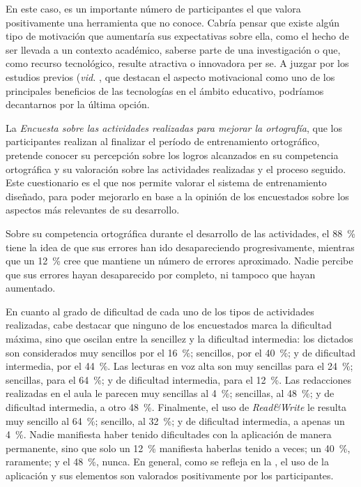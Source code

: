 \documentclass[spanish]{textolivre}
\begin{document}
En este caso, es un importante número de participantes el que valora positivamente una herramienta que no conoce. Cabría pensar que existe algún tipo de motivación que aumentaría sus expectativas sobre ella, como el hecho de ser llevada a un contexto académico, saberse parte de una investigación o que, como recurso tecnológico, resulte atractiva o innovadora per se. A juzgar por los estudios previos (\textit{vid.} \textcite{palomo_tic_2006,marques_graells_impacto_2013}, que destacan el aspecto motivacional como uno de los principales beneficios de las tecnologías en el ámbito educativo, podríamos decantarnos por la última opción.

La \textit{Encuesta sobre las actividades realizadas para mejorar la ortografía}, que los participantes realizan al finalizar el período de entrenamiento ortográfico, pretende conocer su percepción sobre los logros alcanzados en su competencia ortográfica y su valoración sobre las actividades realizadas y el proceso seguido. Este cuestionario es el que nos permite valorar el sistema de entrenamiento diseñado, para poder mejorarlo en base a la opinión de los encuestados sobre los aspectos más relevantes de su desarrollo.

Sobre su competencia ortográfica durante el desarrollo de las actividades, el 88~\% tiene la idea de que sus errores han ido desapareciendo progresivamente, mientras que un 12~\% cree que mantiene un número de errores aproximado. Nadie percibe que sus errores hayan desaparecido por completo, ni tampoco que hayan aumentado.

En cuanto al grado de dificultad de cada uno de los tipos de actividades realizadas, cabe destacar que ninguno de los encuestados marca la dificultad máxima, sino que oscilan entre la sencillez y la dificultad intermedia: los dictados son considerados muy sencillos por el 16~\%; sencillos, por el 40~\%; y de dificultad intermedia, por el 44~\%. Las lecturas en voz alta son muy sencillas para el 24~\%; sencillas, para el 64~\%; y de dificultad intermedia, para el 12~\%. Las redacciones realizadas en el aula le parecen muy sencillas al 4~\%; sencillas, al 48~\%; y de dificultad intermedia, a otro 48~\%. Finalmente, el uso de \textit{Read\&Write} le resulta muy sencillo al 64~\%; sencillo, al 32~\%; y de dificultad intermedia, a apenas un 4~\%. Nadie manifiesta haber tenido dificultades con la aplicación de manera permanente, sino que solo un 12~\% manifiesta haberlas tenido a veces; un 40~\%, raramente; y el 48~\%, nunca. En general, como se refleja en la , el uso de la aplicación y sus elementos son valorados positivamente por los participantes.
\end{document}
